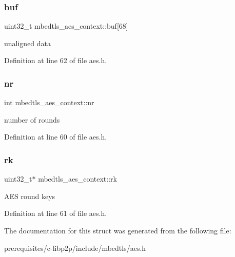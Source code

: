 \subsubsection{\texorpdfstring{buf}{buf}}
{\footnotesize\ttfamily uint32\+\_\+t mbedtls\+\_\+aes\+\_\+context\+::buf\mbox{[}68\mbox{]}}

unaligned data 

Definition at line 62 of file aes.\+h.

\mbox{\label{structmbedtls__aes__context_ad0b4f626fa3881c76f23a9a96812b69a}} 
\subsubsection{\texorpdfstring{nr}{nr}}
{\footnotesize\ttfamily int mbedtls\+\_\+aes\+\_\+context\+::nr}

number of rounds 

Definition at line 60 of file aes.\+h.

\mbox{\label{structmbedtls__aes__context_ac7e235e5b270daba3635f5e39949b7a4}} 
\subsubsection{\texorpdfstring{rk}{rk}}
{\footnotesize\ttfamily uint32\+\_\+t$\ast$ mbedtls\+\_\+aes\+\_\+context\+::rk}

A\+ES round keys 

Definition at line 61 of file aes.\+h.



The documentation for this struct was generated from the following file\+:\begin{DoxyCompactItemize}
\item 
prerequisites/c-\/libp2p/include/mbedtls/aes.\+h\end{DoxyCompactItemize}
